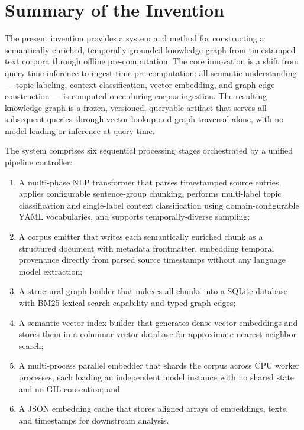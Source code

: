 \documentclass[12pt,letterpaper]{article}
\begin{document}
\section*{Summary of the Invention}

The present invention provides a system and method for constructing a semantically
enriched, temporally grounded knowledge graph from timestamped text corpora through
offline pre-computation. The core innovation is a shift from query-time inference to
ingest-time pre-computation: all semantic understanding --- topic labeling, context
classification, vector embedding, and graph edge construction --- is computed once
during corpus ingestion. The resulting knowledge graph is a frozen, versioned,
queryable artifact that serves all subsequent queries through vector lookup and graph
traversal alone, with no model loading or inference at query time.

The system comprises six sequential processing stages orchestrated by a unified
pipeline controller:

\begin{enumerate}[leftmargin=2cm, itemsep=6pt]

\item A multi-phase NLP transformer that parses timestamped source entries, applies
configurable sentence-group chunking, performs multi-label topic classification and
single-label context classification using domain-configurable YAML vocabularies, and
supports temporally-diverse sampling;

\item A corpus emitter that writes each semantically enriched chunk as a structured
document with metadata frontmatter, embedding temporal provenance directly from parsed
source timestamps without any language model extraction;

\item A structural graph builder that indexes all chunks into a SQLite database with
BM25 lexical search capability and typed graph edges;

\item A semantic vector index builder that generates dense vector embeddings and stores
them in a columnar vector database for approximate nearest-neighbor search;

\item A multi-process parallel embedder that shards the corpus across CPU worker
processes, each loading an independent model instance with no shared state and no GIL
contention; and

\item A JSON embedding cache that stores aligned arrays of embeddings, texts, and
timestamps for downstream analysis.

\end{enumerate}
\end{document}
